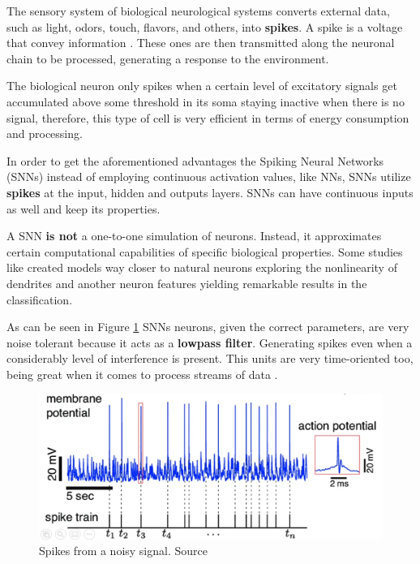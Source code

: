 		\par The sensory system of biological neurological systems converts external data, such as light, odors, touch, flavors, and others, into \textbf{spikes}. A spike is a voltage that convey information \cite{kasabov2019time}. These ones are then transmitted along the neuronal chain to be processed, generating a response to the environment.
		
		\par The biological neuron only spikes when a certain level of excitatory signals get accumulated above some threshold in its soma staying inactive when there is no signal, therefore, this type of cell is very efficient in terms of energy consumption and processing.
		
		\par In order to get the aforementioned advantages the Spiking Neural Networks (SNNs) instead of employing continuous activation values, like NNs, SNNs utilize \textbf{spikes} at the input, hidden and outputs layers. SNNs can have continuous inputs as well and keep its properties.
		
		
		\par A SNN \textbf{is not} a one-to-one simulation of neurons. Instead, it approximates certain computational capabilities of specific biological properties. Some studies like \cite{jones2020single} created models way closer to natural neurons exploring the nonlinearity of dendrites and another neuron features yielding remarkable results in the classification.
		
		\par As can be seen in Figure \ref{fig:neuronspike} SNNs neurons, given the correct parameters, are very noise tolerant because it acts as a \textbf{lowpass filter}. Generating spikes even when a considerably level of interference is present. This units are very time-oriented too, being great when it comes to process streams of data \cite{10242251}.
		
		\begin{figure}[H]
			\centering
			\includegraphics[width=\linewidth]{images/neuronSpikes}
			\caption{Spikes from a noisy signal. Source \cite{dan_goodman_2022_7044500}}
			\label{fig:neuronspike}
		\end{figure} 
		
